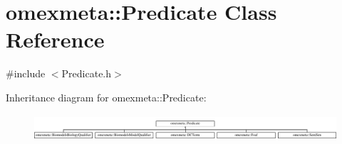 \hypertarget{classomexmeta_1_1Predicate}{}\section{omexmeta\+:\+:Predicate Class Reference}
\label{classomexmeta_1_1Predicate}


{\ttfamily \#include $<$Predicate.\+h$>$}

Inheritance diagram for omexmeta\+:\+:Predicate\+:\begin{figure}[H]
\begin{center}
\leavevmode
\includegraphics[height=0.978166cm]{classomexmeta_1_1Predicate}
\end{center}
\end{figure}
